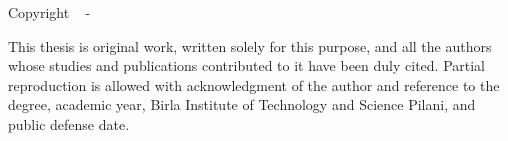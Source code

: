 
\vspace*{\fill}

\noindent \textbf{\GetTitle}

\noindent Copyright \textcopyright~\the\year{} - \GetFirstAuthor

\vspace{.575em}

\noindent This thesis is original work, written solely for this purpose, and all the authors whose studies and publications contributed to it have been duly cited. Partial reproduction is allowed with acknowledgment of the author and reference to the degree, academic year, Birla Institute of Technology and Science Pilani, and public defense date.

\vspace*{\fill}
